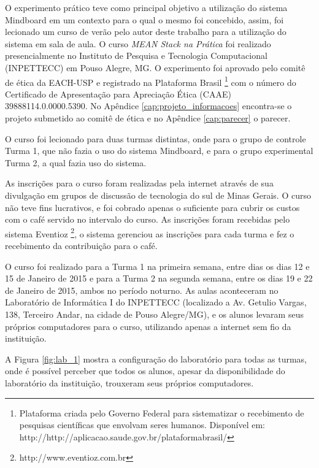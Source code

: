 O experimento prático teve como principal objetivo a utilização do sistema Mindboard em um contexto para o qual o mesmo foi concebido, assim, foi lecionado um curso de verão pelo autor deste trabalho para a utilização do sistema em sala de aula. O curso \emph{MEAN Stack na Prática} foi realizado presencialmente no Instituto de Pesquisa e Tecnologia Computacional (INPETTECC) em Pouso Alegre, MG. O experimento foi aprovado pelo comitê de ética da EACH-USP e registrado na Plataforma Brasil \footnote{Plataforma criada pelo Governo Federal para sistematizar o recebimento de pesquisas científicas que envolvam seres humanos. Disponível em: http://http://aplicacao.saude.gov.br/plataformabrasil/} com o número do Certificado de Apresentação para Apreciação Ética (CAAE) 39888114.0.0000.5390. No Apêndice \ref{cap:projeto_informacoes} encontra-se o projeto submetido ao comitê de ética e no Apêndice \ref{cap:parecer} o parecer.

O curso foi lecionado para duas turmas distintas, onde para o grupo de controle Turma 1, que não fazia o uso do sistema Mindboard, e para o grupo experimental Turma 2, a qual fazia uso do sistema.

As inscrições para o curso foram realizadas pela internet através de sua divulgação em grupos de discussão de tecnologia do sul de Minas Gerais. O curso não teve fins lucrativos, e foi cobrado apenas o suficiente para cubrir os custos com o café servido no intervalo do curso. As inscrições foram recebidas pelo sistema Eventioz \footnote{http://www.eventioz.com.br}, o sistema gerenciou as inscrições para cada turma e fez o recebimento da contribuição para o café.

O curso foi realizado para a Turma 1 na primeira semana, entre dias os dias 12 e 15 de Janeiro de 2015 e para a Turma 2 na segunda semana, entre os dias 19 e 22 de Janeiro de 2015, ambos no período noturno.  As aulas aconteceram no Laboratório de Informática I do INPETTECC (localizado a Av. Getulio Vargas, 138, Terceiro Andar, na cidade de Pouso Alegre/MG), e os alunos levaram seus próprios computadores para o curso, utilizando apenas a internet sem fio da instituição.

A Figura \ref{fig:lab_1} mostra a configuração do laboratório para todas as turmas, onde é possível perceber que todos os alunos, apesar da disponibilidade do laboratório da instituição, trouxeram seus próprios computadores.


